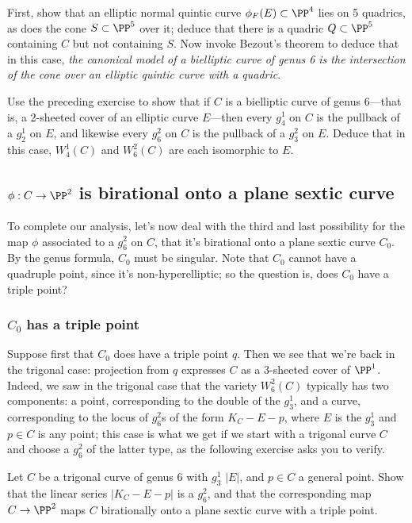 \begin{exercise}
First, show that an elliptic normal quintic curve $\phi_F(E) \subset \PP^4$ lies on 5 quadrics, as does the cone $S \subset \PP^5$ over it; deduce that there is a quadric $Q \subset \PP^5$ containing $C$ but not containing $S$. Now invoke Bezout's theorem to deduce that in this case, \emph{the canonical model of a bielliptic curve of genus 6 is the intersection of the cone over an elliptic quintic curve with a quadric}.
\end{exercise}


\begin{exercise}
Use the preceding exercise to show that if $C$ is a bielliptic curve of genus 6---that is, a 2-sheeted cover of an elliptic curve $E$---then every $g^1_4$ on $C$ is the pullback of a $g^1_2$ on $E$, and likewise  every $g^2_6$ on $C$ is the pullback of a $g^2_3$ on $E$. Deduce that in this case, $W^1_4(C)$ and $W^2_6(C)$ are each isomorphic to $E$.
\end{exercise}

\subsection{$\phi : C \to \PP^2$ is birational onto a plane sextic curve}

To complete our analysis, let's now deal with the third and last possibility for the map $\phi$ associated to a $g^2_6$ on $C$, that it's birational onto a plane sextic curve $C_0$. By the genus formula, $C_0$ must be singular. Note that $C_0$ cannot have a quadruple point, since it's non-hyperelliptic; so the question is, does $C_0$ have a triple point?

\subsubsection{$C_0$ has a triple point} Suppose first that $C_0$ does have a triple point $q$. Then we see that we're back in the trigonal case: projection from $q$ expresses $C$ as a 3-sheeted cover of $\PP^1$. Indeed, we saw in the trigonal case that the variety $W^2_6(C)$ typically has two components: a point, corresponding to the double of the $g^1_3$, and a curve, corresponding to the locus of $g^2_6$s of the form $K_C - E - p$, where $E$ is the $g^1_3$ and $p \in C$ is any point; this case is what we get if we start with a trigonal curve $C$ and choose a $g^2_6$ of the latter type, as the following exercise asks you to verify.


\begin{exercise}
Let $C$ be a trigonal curve of genus 6 with $g^1_3$ $|E|$, and $p \in C$ a general point. Show that the linear series $|K_C - E-p|$ is a $g^2_6$, and that the corresponding map $C \to \PP^2$ maps $C$ birationally onto a plane sextic curve with a triple point.
\end{exercise}

